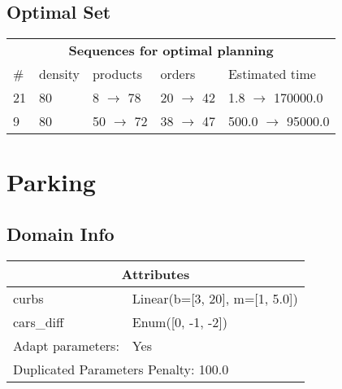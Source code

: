 \documentclass{article}
\begin{document}
                            \subsection*{Optimal Set}

                            \begin{center}
                            \begin{tabular}{l|l|l|l|l}
                            \multicolumn{5}{c}{\bf \large Sequences for optimal planning}\\
                            \# & density & products & orders & Estimated time\\\midrule
                            21&80&8 $\rightarrow$ 78&20 $\rightarrow$ 42&1.8 $\rightarrow$ 170000.0\\
9&80&50 $\rightarrow$ 72&38 $\rightarrow$ 47&500.0 $\rightarrow$ 95000.0
                            \end{tabular}
                            \end{center}
                    \newpage \section{Parking}
                    \subsection*{Domain Info}

                    \begin{center}
                    \begin{tabular}{p{}p{}}
                    \multicolumn{2}{c}{\bf \large Attributes}\\\midrule
                    curbs & Linear(b=[3, 20], m=[1, 5.0])\\
cars\_diff & Enum([0, -1, -2])
                    
                    \\\midrule
                    Adapt parameters: & Yes
                
                     \\\midrule
                    \multicolumn{2}{l}{Duplicated Parameters Penalty: 100.0}
                    \end{tabular}
                    \end{center}
                
\end{document}

